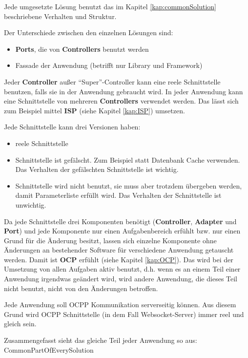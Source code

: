 Jede umgesetzte Lösung benutzt das im Kapitel \ref{kap:commonSolution} beschriebene Verhalten und Struktur. 

Der Unterschiede zwischen den einzelnen Lösungen sind:
\begin{itemize}
    \item \textbf{Ports}, die von \textbf{Controllers} benutzt werden
    \item Fassade der Anwendung (betrifft nur Library und Framework)
\end{itemize}

Jeder \textbf{Controller} außer ``Super''-Controller kann eine reele Schnittstelle benutzen, 
falls sie in der Anwendung gebraucht wird. In jeder Anwendung kann eine Schnittstelle von mehreren \textbf{Controllers} verwendet werden.
Das lässt sich zum Beispiel mittel \textbf{ISP} (siehe Kapitel \ref{kap:ISP}) umsetzen.

Jede Schnittstelle kann drei Versionen haben:
\begin{itemize}
    \item reele Schnittstelle
    \item Schnittstelle ist gefälscht. Zum Beispiel statt Datenbank Cache verwenden. Das Verhalten der gefälschten Schnittstelle ist wichtig.
    \item Schnittstelle wird nicht benutzt, sie muss aber trotzdem übergeben werden, 
    damit Parameterliste erfüllt wird. Das Verhalten der Schnittstelle ist unwichtig.
\end{itemize}

Da jede Schnittstelle drei Komponenten benötigt (\textbf{Controller}, \textbf{Adapter} und \textbf{Port}) und jede Komponente nur einen Aufgabenbereich erfühlt
bzw. nur einen Grund für die Änderung besitzt, lassen sich einzelne Komponente ohne Änderungen an bestehender Software für verschiedene Anwendung getauscht werden. 
Damit ist \textbf{OCP} erfühlt (siehe Kapitel \ref{kap:OCP}). Das wird bei der Umsetzung von allen Aufgaben aktiv benutzt, d.h. wenn es an einem Teil einer Anwendung 
irgendwas geändert wird, wird andere Anwendung, die dieses Teil nicht benutzt, nicht von den Änderungen betroffen.

\newpage
Jede Anwendung soll OCPP Kommunikation serverseitig können. 
Aus diesem Grund wird OCPP Schnittstelle (in dem Fall Websocket-Server) immer reel und gleich sein.

Zusammengefasst sieht das gleiche Teil jeder Anwendung so aus:
{CommonPartOfEverySolution}